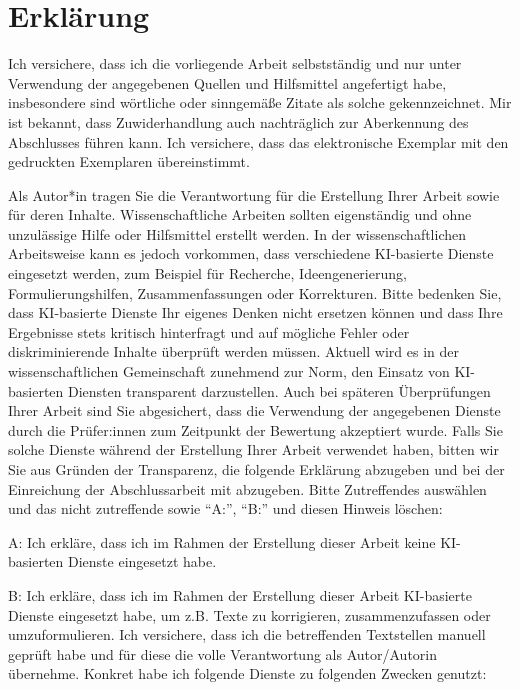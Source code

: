 \chapter*{Erklärung}
\thispagestyle{empty}
Ich versichere, dass ich die vorliegende Arbeit selbstständig und nur unter Verwendung der angegebenen Quellen und Hilfsmittel angefertigt habe, insbesondere sind wörtliche oder sinngemäße Zitate als solche gekennzeichnet.
Mir ist bekannt, dass Zuwiderhandlung auch nachträglich zur Aberkennung des Abschlusses führen kann.
Ich versichere, dass das elektronische Exemplar mit den gedruckten Exemplaren übereinstimmt.

\begin{temp}
Als Autor*in tragen Sie die Verantwortung für die Erstellung Ihrer Arbeit sowie für deren Inhalte.
Wissenschaftliche Arbeiten sollten eigenständig und ohne unzulässige Hilfe oder Hilfsmittel erstellt werden.
In der wissenschaftlichen Arbeitsweise kann es jedoch vorkommen, dass verschiedene KI-basierte Dienste eingesetzt werden, zum Beispiel für Recherche, Ideengenerierung, Formulierungshilfen, Zusammenfassungen oder Korrekturen.
Bitte bedenken Sie, dass KI-basierte Dienste Ihr eigenes Denken nicht ersetzen können und dass Ihre Ergebnisse stets kritisch hinterfragt und auf mögliche Fehler oder diskriminierende Inhalte überprüft werden müssen.
Aktuell wird es in der wissenschaftlichen Gemeinschaft zunehmend zur Norm, den Einsatz von KI-basierten Diensten transparent darzustellen.
Auch bei späteren Überprüfungen Ihrer Arbeit sind Sie abgesichert, dass die Verwendung der angegebenen Dienste durch die Prüfer:innen zum Zeitpunkt der Bewertung akzeptiert wurde.
Falls Sie solche Dienste während der Erstellung Ihrer Arbeit verwendet haben, bitten wir Sie aus Gründen der Transparenz, die folgende Erklärung abzugeben und bei der Einreichung der Abschlussarbeit mit abzugeben.
Bitte Zutreffendes auswählen und das nicht zutreffende sowie \enquote{A:}, \enquote{B:} und diesen Hinweis löschen:

\bigskip

A: Ich erkläre, dass ich im Rahmen der Erstellung dieser Arbeit keine KI-basierten Dienste eingesetzt habe.

B: Ich erkläre, dass ich im Rahmen der Erstellung dieser Arbeit KI-basierte Dienste eingesetzt habe, um z.B. Texte zu korrigieren, zusammenzufassen oder umzuformulieren.
Ich versichere, dass ich die betreffenden Textstellen manuell geprüft habe und für diese die volle Verantwortung als Autor/Autorin übernehme. Konkret habe ich folgende Dienste zu folgenden Zwecken genutzt:
\end{temp}

